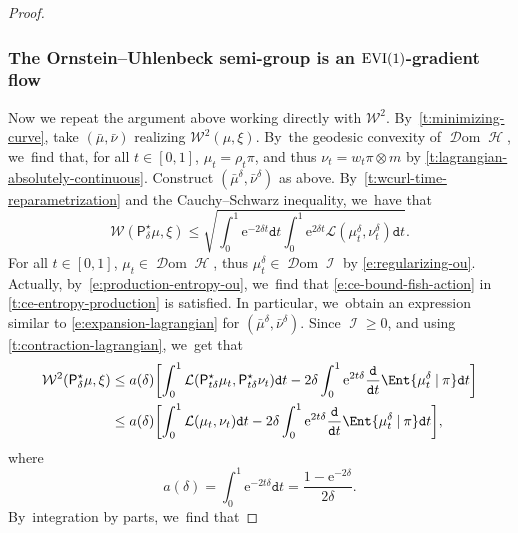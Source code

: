 \documentclass[10pt]{amsart}
\newcommand{\EVI}{\textup{EVI}}
\theoremstyle{definition}
\theoremstyle{remark}
\DeclarePairedDelimiter{\bracket}{\lbrack}{\rbrack}
\newcommand{\given}[1][]{%
\nonscript\:#1\vert
\allowbreak
\nonscript\:
\mathopen{}}
\DeclareMathOperator{\ent}{\mathcal{H}}
\DeclareMathOperator{\fish}{\mathcal{I}}
\DeclareMathOperator{\dom}{\mathscr{D}om}
\begin{document}
\begin{proof}
\subsubsection*{The Ornstein--Uhlenbeck semi-group is an $\EVI(1)$-gradient flow}
Now we repeat the argument above working directly with $\mathcal{W}^{2}$.
By~\cref{t:minimizing-curve}, take $(\bar{\mu}, \bar{\nu})$ realizing $\mathcal{W}^{2}(\mu, \xi)$.
By~the geodesic convexity of $\dom \ent$, we~find that, for all $t \in [0,1]$, $\mu_{t} = \rho_{t} \pi$, and thus $\nu_{t} = w_{t} \pi \otimes m$ by \cref{t:lagrangian-absolutely-continuous}.
Construct $(\bar{\mu}^{\delta}, \bar{\nu}^{\delta})$ as above.
By~\cref{t:wcurl-time-reparametrization} and the Cauchy--Schwarz inequality, we~have that
\begin{equation*}
\mathcal{W}(\mathsf{P}^{\star}_{\delta} \mu, \xi) \leq \sqrt{ \int_{0}^{1} \mathrm{e}^{-2\delta t} \mathtt{d} t \int_{0}^{1} \mathrm{e}^{2 \delta t} \mathcal{L}(\mu_{t}^{\delta}, \nu_{t}^{\delta}) \mathtt{d} t }.
\end{equation*}
For all $t \in [0,1]$, $\mu_{t} \in \dom \ent$, thus $\mu^{\delta}_{t} \in \dom \fish$ by \cref{e:regularizing-ou}.
Actually, by~\cref{e:production-entropy-ou}, we~find that \cref{e:ce-bound-fish-action} in \cref{t:ce-entropy-production} is satisfied.
In particular, we~obtain an expression similar to \cref{e:expansion-lagrangian} for $(\bar{\mu}^{\delta}, \bar{\nu}^{\delta})$.
Since $\fish \geq 0$, and using \cref{t:contraction-lagrangian}, we~get that
\begin{equation}\label{e:bound-w-delta}
\begin{split}
\mathcal{W}^{2}(\mathsf{P}^{\star}_{\delta} \mu, \xi) & \leq a(\delta) \bracket*{ \int_{0}^{1} \mathcal{L}(\mathsf{P}^{\star}_{t\delta} \mu_{t}, \mathsf{P}^{\star}_{t\delta} \nu_{t}) \mathtt{d} t - 2 \delta \int_{0}^{1} \mathrm{e}^{2t\delta} \frac{\mathtt{d}}{\mathtt{d} t} \Ent{ \mu_{t}^{\delta} \given \pi } \mathtt{d} t }
\\& \leq a(\delta) \bracket*{ \int_{0}^{1} \mathcal{L}(\mu_{t}, \nu_{t}) \mathtt{d} t - 2 \delta \int_{0}^{1} \mathrm{e}^{2t\delta} \frac{\mathtt{d}}{\mathtt{d} t} \Ent{ \mu_{t}^{\delta} \given \pi } \mathtt{d} t },
\end{split}
\end{equation}
where
\begin{equation*}
a(\delta) = \int_{0}^{1} \mathrm{e}^{-2t\delta} \mathtt{d} t = \frac{1 - \mathrm{e}^{-2\delta}}{2\delta}.
\end{equation*}
By~integration by parts, we~find that

\end{proof}
\end{document}
